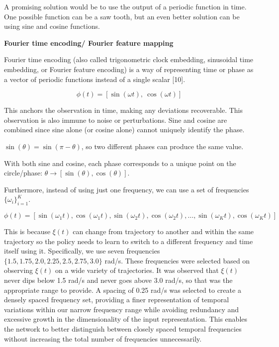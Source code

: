 A promising solution would be to use the output of a periodic function
in time. One possible function can be a saw tooth, but an even better
solution can be using sine and cosine functions.

\noindent\textbf{Fourier time encoding/ Fourier feature mapping}

Fourier time encoding (also called trigonometric clock embedding,
sinusoidal time embedding, or Fourier feature encoding) is a way of
representing time or phase as a vector of periodic functions instead of
a single scalar [10].

\begin{equation}
  \phi(t) = [\sin(\omega t),\ \cos(\omega t)]
  \label{eq:fourier-basic}
\end{equation}

This anchors the observation in time, making any deviations recoverable.
This observation is also immune to noise or perturbations. Sine and
cosine are combined since sine alone (or cosine alone) cannot uniquely
identify the phase.

$\sin(\theta) = \sin(\pi - \theta)$, so two different phases can produce
the same value.

With both sine and cosine, each phase corresponds to a unique point on
the circle/phase: $\theta \longrightarrow [\sin(\theta), \cos(\theta)]$.

Furthermore, instead of using just one frequency, we can use a set of
frequencies $\{\omega_i\}_{i=1}^{K}$.

\begin{equation}
  \phi(t) = [\sin(\omega_1 t), \cos(\omega_1 t), \sin(\omega_2 t), \cos(\omega_2 t), \dots, \sin(\omega_K t), \cos(\omega_K t)]
  \label{eq:fourier-general}
\end{equation}

This is because $\xi(t)$ can change from trajectory to another and
within the same trajectory so the policy needs to learn to switch to a
different frequency and time itself using it. Specifically, we use seven
frequencies $\{1.5, 1.75, 2.0, 2.25, 2.5, 2.75, 3.0\}$ rad/s. These
frequencies were selected based on observing $\xi(t)$ on a wide
variety of trajectories. It was observed that $\xi(t)$ never dips
below 1.5 rad/s and never goes above 3.0 rad/s, so that was the
appropriate range to provide. A spacing of 0.25 rad/s was selected to
create a densely spaced frequency set, providing a finer representation
of temporal variations within our narrow frequency range while avoiding
redundancy and excessive growth in the dimensionality of the input
representation. This enables the network to better distinguish between
closely spaced temporal frequencies without increasing the total number
of frequencies unnecessarily.

